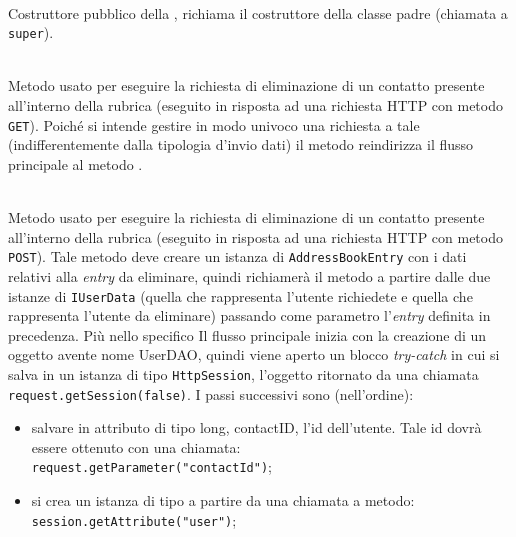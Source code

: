 \begin{description}
	\item{}\\
	Costruttore pubblico della , richiama il costruttore della classe padre (chiamata a \texttt{super}).
	
	\item{}\\
	Metodo usato per eseguire la richiesta di eliminazione di un contatto presente all'interno della rubrica (eseguito in risposta ad una richiesta HTTP con metodo \texttt{GET}). Poiché si intende gestire in modo univoco una richiesta a tale  (indifferentemente dalla tipologia d'invio dati) il metodo reindirizza il flusso principale al metodo .
	
	\item{}\\	
	Metodo usato per eseguire la richiesta di eliminazione di un contatto presente all'interno della rubrica (eseguito in risposta ad una richiesta HTTP con metodo \texttt{POST}). Tale metodo deve creare un istanza di \texttt{AddressBookEntry} con i dati relativi alla \textit{entry} da eliminare, quindi richiamerà il metodo  a partire dalle due istanze di \texttt{IUserData} (quella che rappresenta l'utente richiedete e quella che rappresenta l'utente da eliminare) passando come parametro l'\textit{entry} definita in precedenza. Più nello specifico Il flusso principale inizia  con la creazione di un oggetto  avente nome UserDAO, quindi viene aperto un blocco \textit{try-catch} in cui si salva in un istanza di tipo \texttt{HttpSession}, l'oggetto ritornato da una chiamata \verb|request.getSession(false)|. I passi successivi sono (nell'ordine):
	\begin{itemize}
		\item salvare in attributo di tipo long, contactID, l'id dell'utente. Tale id dovrà essere ottenuto con una chiamata:\\
		\verb|request.getParameter("contactId")|;\\
		
		\item si crea un istanza di tipo  a partire da una chiamata a metodo:\\
		\verb|session.getAttribute("user")|;
		

\end{itemize}
\end{description}
